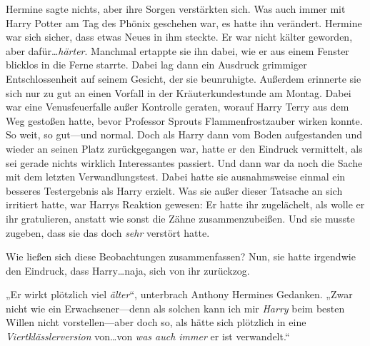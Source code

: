 Hermine sagte nichts, aber ihre Sorgen verstärkten sich.
Was auch immer mit Harry Potter am Tag des Phönix geschehen war, es hatte ihn verändert. Hermine war sich sicher, dass etwas Neues in ihm steckte. Er war nicht kälter geworden, aber dafür…\emph{härter}. Manchmal ertappte sie ihn dabei, wie er aus einem Fenster blicklos in die Ferne starrte. Dabei lag dann ein Ausdruck grimmiger Entschlossenheit auf seinem Gesicht, der sie beunruhigte. Außerdem erinnerte sie sich nur zu gut an einen Vorfall in der Kräuterkundestunde am Montag. Dabei war eine Venusfeuerfalle außer Kontrolle geraten, worauf Harry Terry aus dem Weg gestoßen hatte, bevor Professor Sprouts Flammenfrostzauber wirken konnte. So weit, so gut—und normal. Doch als Harry dann vom Boden aufgestanden und wieder an seinen Platz zurückgegangen war, hatte er den Eindruck vermittelt, als sei gerade nichts wirklich Interessantes passiert.
Und dann war da noch die Sache mit dem letzten Verwandlungstest. Dabei hatte sie ausnahmsweise einmal ein besseres Testergebnis als Harry erzielt. Was sie außer dieser Tatsache an sich irritiert hatte, war Harrys Reaktion gewesen: Er hatte ihr zugelächelt, als wolle er ihr gratulieren, anstatt wie sonst die Zähne zusammenzubeißen. Und sie musste zugeben, dass sie das doch \emph{sehr} verstört hatte.

%
Wie ließen sich diese Beobachtungen zusammenfassen? Nun, sie hatte irgendwie den Eindruck, dass Harry…naja, sich von ihr zurückzog.

„Er wirkt plötzlich viel \emph{älter}“, unterbrach Anthony Hermines Gedanken. „Zwar nicht wie ein Erwachsener—denn als solchen kann ich mir \emph{Harry} beim besten Willen nicht vorstellen—aber doch so, als hätte sich plötzlich in eine \emph{Viertklässlerversion} von…von \emph{was auch immer} er ist verwandelt.“

